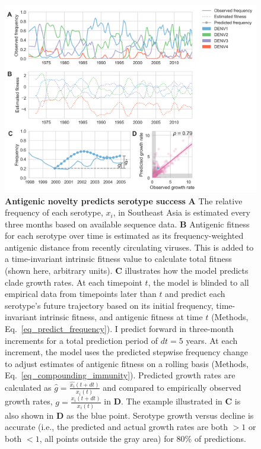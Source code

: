 \begin{figure}[h!]
  \begin{centering}
    \includegraphics[width=\linewidth]{./png/serotype_fitness_model.png}
  	\caption[Antigenic novelty predicts serotype success]{\textbf{Antigenic novelty predicts serotype success }
    \textbf{A} The relative frequency of each serotype, $x_i$, in Southeast Asia is estimated every three months based on available sequence data.
    \textbf{B} Antigenic fitness for each serotype over time is estimated as its frequency-weighted antigenic distance from recently circulating viruses.
    This is added to a time-invariant intrinsic fitness value to calculate total fitness (shown here, arbitrary units).
    \textbf{C} illustrates how the model predicts clade growth rates.
    At each timepoint $t$, the model is blinded to all empirical data from timepoints later than $t$ and predict each serotype's future trajectory based on its initial frequency, time-invariant intrinsic fitness, and antigenic fitness at time $t$ (Methods, Eq.~\ref{eq_predict_frequency}).
    I predict forward in three-month increments for a total prediction period of $dt = 5$ years.
    At each increment, the model uses the predicted stepwise frequency change to adjust estimates of antigenic fitness on a rolling basis (Methods, Eq.~\ref{eq_compounding_immunity}).
    Predicted growth rates are calculated as $\hat{g} = \frac{\hat{x_i}(t+dt)}{x_i(t)}$ and compared to empirically observed growth rates, $g = \frac{x_i(t+dt)}{x_i(t)}$ in \textbf{D}.
    The example illustrated in \textbf{C} is also shown in \textbf{D} as the blue point.
    Serotype growth versus decline is accurate (i.e., the predicted and actual growth rates are both $>1$ or both $<1$, all points outside the gray area) for 80\% of predictions.
    }
  	\label{serotype_fitness_model}
  \end{centering}
\end{figure}

